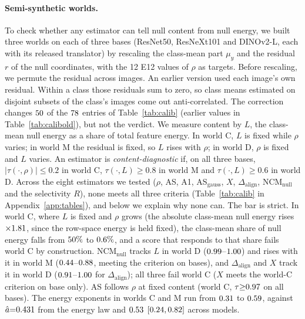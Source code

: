 \documentclass[10pt]{article}
\begin{document}
\paragraph{Semi-synthetic worlds.}
To check whether any estimator can tell null content from null energy, we built three worlds on each of three bases (ResNet50, ResNeXt101 and DINOv2-L, each with its released translator) by rescaling the class-mean part $\mu_y$ and the residual $r$ of the null coordinates, with the 12 E12 values of $\rho$ as targets.
Before rescaling, we permute the residual across images. An earlier version used each image's own residual. Within a class those residuals sum to zero, so class means estimated on disjoint subsets of the class's images come out anti-correlated. The correction changes $50$ of the $78$ entries of Table~\ref{tab:calib} (earlier values in Table~\ref{tab:calibold}), but not the verdict.
We measure content by $L$, the class-mean null energy as a share of total feature energy. In world C, $L$ is fixed while $\rho$ varies; in world M the residual is fixed, so $L$ rises with $\rho$; in world D, $\rho$ is fixed and $L$ varies.
An estimator is \emph{content-diagnostic} if, on all three bases, $|\tau(\cdot,\rho)|\le0.2$ in world C, $\tau(\cdot,L)\ge0.8$ in world M and $\tau(\cdot,L)\ge0.6$ in world D.
Across the eight estimators we tested ($\rho$, AS, A1, AS$_{\mathrm{gauss}}$, $X$, $\Delta_{\mathrm{align}}$, NCM$_{\mathrm{null}}$ and the selectivity $R$), none meets all three criteria (Table~\ref{tab:calib} in Appendix~\ref{app:tables}), and below we explain why none can.
The bar is strict. In world C, where $L$ is fixed and $\rho$ grows (the absolute class-mean null energy rises ${\times}1.81$, since the row-space energy is held fixed), the class-mean share of null energy falls from $50\%$ to $0.6\%$, and a score that responds to that share fails world C by construction.
NCM$_{\mathrm{null}}$ tracks $L$ in world D ($0.99$--$1.00$) and rises with it in world M ($0.44$--$0.88$, meeting the criterion on \QNcmCalMPass{} bases), and $\Delta_{\mathrm{align}}$ and $X$ track it in world D ($0.91$--$1.00$ for $\Delta_{\mathrm{align}}$); all three fail world C ($X$ meets the world-C criterion on \QCalXCPass{} base only).
AS follows $\rho$ at fixed content (world C, $\tau{\ge}0.97$ on all bases).
The energy exponents in worlds C and M run from $0.31$ to $0.59$, against $\hat a{=}0.431$ from the energy law and $0.53$ $[0.24,0.82]$ across models.
\end{document}
